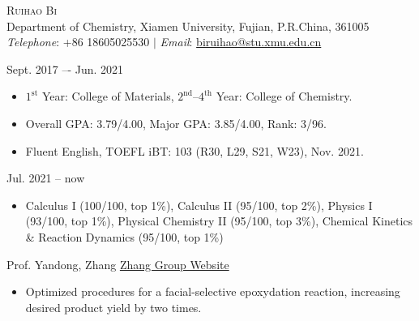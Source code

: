 \pagestyle{plain}
\thispagestyle{empty} %
{\begin{center}
\Large{\textsc{Ruihao Bi}} \\ \normalsize {Department of Chemistry, Xiamen University, Fujian, P.R.China, 361005} \\ \textit{Telephone}: {+86 18605025530} $|$ \textit{Email}: {\href{mailto:biruihao@stu.xmu.edu.cn}{biruihao@stu.xmu.edu.cn}} 
\end{center}}

\sectionrule
{}

{ \hfill {Sept. 2017 –- Jun. 2021}}

\begin{itemize}
\item $\mathrm{1^{st}}$ Year: College of Materials, $\mathrm{2^{nd}}$--$\mathrm{4^{th}}$ Year:	College of Chemistry.
\item Overall GPA: 3.79/4.00, Major GPA: 3.85/4.00, Rank: 3/96.
\item Fluent English, TOEFL iBT: 103 (R30, L29, S21, W23), Nov. 2021.
\end{itemize}

{ \hfill {Jul. 2021 -- now}}


\noindent{}
\begin{itemize}

\item Calculus I (100/100, top 1\%), Calculus II (95/100, top 2\%), Physics I (93/100, top 1\%), Physical Chemistry II (95/100, top 3\%), Chemical Kinetics \& Reaction Dynamics (95/100, top 1\%)
\end{itemize}

\vspace{5mm}
\sectionrule
{}


{\noindent Prof. Yandong, Zhang  \hfill \href{https://zhanglab.xmu.edu.cn/}{Zhang Group Website}}


\begin{itemize}
\item{Optimized procedures for a facial-selective epoxydation reaction, increasing desired product yield by two times.}
\end{itemize}


